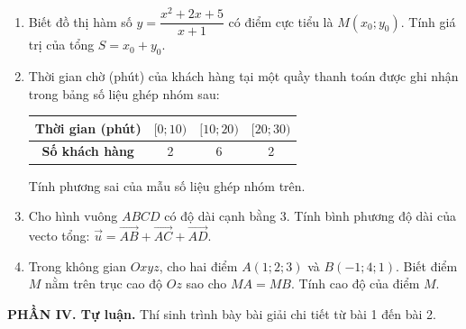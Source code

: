 \documentclass[12pt]{article}
\begin{document}
	\begin{enumerate}[label=\textbf{Câu \arabic*.}, leftmargin=*]
		
		\item Biết đồ thị hàm số $y = \dfrac{x^2 + 2x + 5}{x + 1}$ có điểm cực tiểu là $M(x_0; y_0)$. Tính giá trị của tổng $S = x_0 + y_0$.
		
		\vspace{2mm}
		\item Thời gian chờ (phút) của khách hàng tại một quầy thanh toán được ghi nhận trong bảng số liệu ghép nhóm sau:
		\begin{center}
			\renewcommand{\arraystretch}{1.2}
			\begin{tabular}{|c|c|c|c|}
				\hline
				\textbf{Thời gian (phút)} & $[0; 10)$ & $[10; 20)$ & $[20; 30)$ \\
				\hline
				\textbf{Số khách hàng} & 2 & 6 & 2 \\
				\hline
			\end{tabular}
		\end{center}
		Tính phương sai của mẫu số liệu ghép nhóm trên.
		
		\vspace{2mm}
		\item Cho hình vuông $ABCD$ có độ dài cạnh bằng $3$. Tính bình phương độ dài của vecto tổng: $\vec{u} = \overrightarrow{AB} + \overrightarrow{AC} + \overrightarrow{AD}$.
		
		\vspace{2mm}
		\item Trong không gian $Oxyz$, cho hai điểm $A(1; 2; 3)$ và $B(-1; 4; 1)$. Biết điểm $M$ nằm trên trục cao độ $Oz$ sao cho $MA = MB$. Tính cao độ của điểm $M$.
		
	\end{enumerate}
	
	\vspace{4mm}
	\noindent\textbf{PHẦN IV. Tự luận.} Thí sinh trình bày bài giải chi tiết từ bài 1 đến bài 2.
	\vspace{2mm}
	
\end{document}
